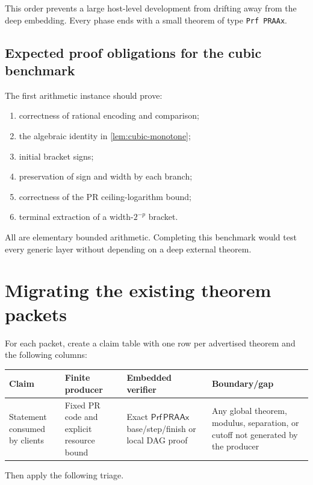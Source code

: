 \documentclass[11pt]{article}
\newcommand{\PRAAx}{\mathsf{PRAAx}}
\newcommand{\Prf}{\mathsf{Prf}}
\begin{document}
This order prevents a large host-level development from drifting away from the
deep embedding.  Every phase ends with a small theorem of type
\texttt{Prf PRAAx}.

\subsection{Expected proof obligations for the cubic benchmark}

The first arithmetic instance should prove:

\begin{enumerate}
\item correctness of rational encoding and comparison;
\item the algebraic identity in \cref{lem:cubic-monotone};
\item initial bracket signs;
\item preservation of sign and width by each branch;
\item correctness of the PR ceiling-logarithm bound;
\item terminal extraction of a width-\(2^{-p}\) bracket.
\end{enumerate}

All are elementary bounded arithmetic.  Completing this benchmark would test
every generic layer without depending on a deep external theorem.

\section{Migrating the existing theorem packets}

For each packet, create a claim table with one row per advertised theorem and
the following columns:

\begin{longtable}{p{}p{}p{}p{}}
\toprule
Claim & Finite producer & Embedded verifier & Boundary/gap \\
\midrule
\endhead
Statement consumed by clients & Fixed PR code and explicit resource bound &
Exact \(\Prf\,\PRAAx\) base/step/finish or local DAG proof & Any global theorem,
modulus, separation, or cutoff not generated by the producer \\
\bottomrule
\end{longtable}

Then apply the following triage.
\end{document}
